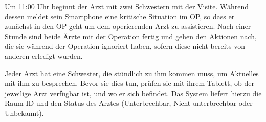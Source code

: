 Um 11:00 Uhr beginnt der Arzt mit zwei Schwestern mit der Visite. Während dessen meldet sein Smartphone eine kritische Situation im OP, so dass er zunächst in den OP geht um dem operierenden Arzt zu assistieren. Nach einer Stunde sind beide Ärzte mit der Operation fertig und gehen den Aktionen nach, die sie während der Operation ignoriert haben, sofern diese nicht bereits von anderen erledigt wurden.

Jeder Arzt hat eine Schwester, die stündlich zu ihm kommen muss, um Aktuelles mit ihm zu besprechen. Bevor sie dies tun, prüfen sie mit ihrem Tablett, ob der jeweilige Arzt verfügbar ist, und wo er sich befindet. Das System liefert hierzu die Raum ID und den Status des Arztes (Unterbrechbar, Nicht unterbrechbar oder Unbekannt).


